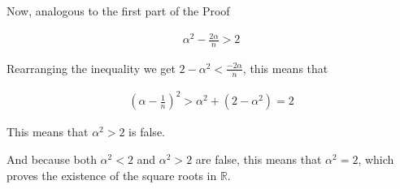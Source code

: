 \documentclass{article}
\begin{document}
Now, analogous to the first part of the Proof

\begin{align*}
    \alpha^{2} - \frac{2\alpha}{n} > 2
\end{align*}

Rearranging the inequality we get $2-\alpha^{2} < \frac{-2\alpha}{n}$, this
means that

\begin{align*}
    \left(\alpha - \frac{1}{n}\right)^{2} > \alpha^{2} + (2-\alpha^{2}) = 2
\end{align*}

This means that $\alpha^{2} > 2$ is false.

And because both $\alpha^{2} < 2$ and $\alpha^{2} > 2$ are false, this means
that $\alpha^{2} = 2$, which proves the existence of the square roots in $\mathbb{R}$.
\end{document}
